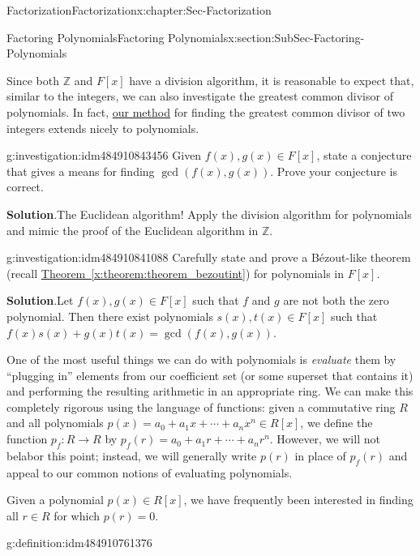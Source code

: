 \documentclass[oneside,10pt,]{book}
\newcommand{\blocktitlefont}{\relax}
\newcommand{\xreffont}{\relax}
\numberwithin{equation}{section}
\def\Z{{\mathbb Z}}
\begin{document}
\begin{chapterptx}{Factorization}{}{Factorization}{}{}{x:chapter:Sec-Factorization}
\begin{sectionptx}{Factoring Polynomials}{}{Factoring Polynomials}{}{}{x:section:SubSec-Factoring-Polynomials}
\par
Since both \(\Z\) and \(F[x]\) have a division algorithm, it is reasonable to expect that, similar to the integers, we can also investigate the greatest common divisor of polynomials. In fact, \hyperref[x:investigation:invest-euclid-alg-integers]{our method} for finding the greatest common divisor of two integers extends nicely to polynomials.%
\begin{investigation}{}{g:investigation:idm484910843456}%
Given \(f(x),g(x)\in F[x]\), state a conjecture that gives a means for finding \(\gcd(f(x),g(x))\). Prove your conjecture is correct.%
\par\smallskip%
\noindent\textbf{\blocktitlefont Solution}.\hypertarget{g:solution:idm484910842176}{}\quad{}The Euclidean algorithm! Apply the division algorithm for polynomials and mimic the proof of the Euclidean algorithm in \(\Z\).%
\end{investigation}
\begin{investigation}{}{g:investigation:idm484910841088}%
Carefully state and prove a Bézout-like theorem (recall \hyperref[x:theorem:theorem_bezoutint]{Theorem~{\xreffont\ref{x:theorem:theorem_bezoutint}}}) for polynomials in \(F[x]\).%
\par\smallskip%
\noindent\textbf{\blocktitlefont Solution}.\hypertarget{g:solution:idm484910839424}{}\quad{}Let \(f(x),
g(x)\in F[x]\) such that \(f\) and \(g\) are not both the zero polynomial. Then there exist polynomials \(s(x),
t(x)\in F[x]\) such that \(f(x) s(x) + g(x) t(x) = \gcd(f(x),g(x))\).%
\end{investigation}
One of the most useful things we can do with polynomials is \emph{evaluate} them by ``plugging in'' elements from our coefficient set (or some superset that contains it) and performing the resulting arithmetic in an appropriate ring. We can make this completely rigorous using the language of functions: given a commutative ring \(R\) and all polynomials \(p(x) = a_0 + a_1 x + \cdots + a_n x^n \in R[x]\), we define the function \(p_f : R\to R\) by \(p_f(r) = a_0 + a_1 r + \cdots + a_n r^n \). However, we will not belabor this point; instead, we will generally write \(p(r)\) in place of \(p_f(r)\) and appeal to our common notions of evaluating polynomials.%
\par
Given a polynomial \(p(x)\in R[x]\), we have frequently been interested in finding all \(r\in R\) for which \(p(r) = 0\).%
\begin{definition}{}{g:definition:idm484910761376}%
%
%

\end{definition}
\end{sectionptx}
\end{chapterptx}
\end{document}

